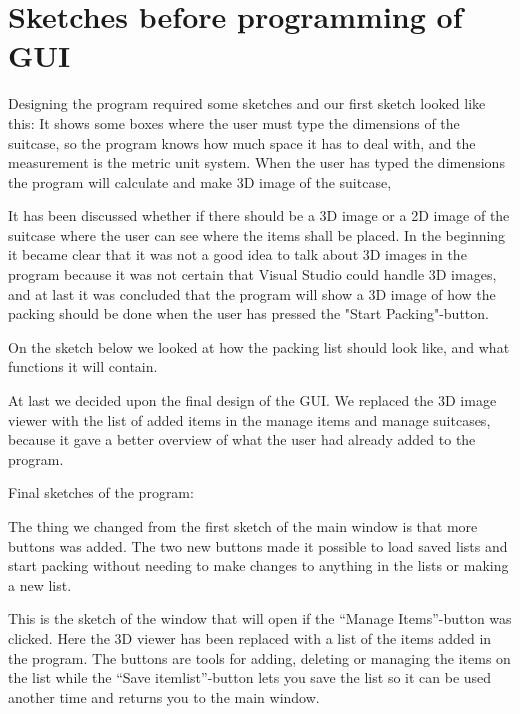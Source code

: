 \section{Sketches before programming of GUI}

Designing the program required some sketches and our first sketch looked like this:
It shows some boxes where the user must type the dimensions of the suitcase, so the program knows how much space it has to deal with, and the measurement is the metric unit system.
When the user has typed the dimensions the program will calculate and make 3D image of the suitcase, 


It has been discussed whether if there should be a 3D image or a 2D image of the suitcase where the user can see where the items shall be placed. In the beginning it became clear that it was not a good idea to talk about 3D images in the program because it was not certain that Visual Studio could handle 3D images, and at last it was concluded that the program will show a 3D image of how the packing should be done when the user has pressed the "Start Packing"-button.


On the sketch below we looked at how the packing list should look like, and what functions it will contain.


At last we decided upon the final design of the GUI. We replaced the 3D image viewer with the list of added items in the manage items and manage suitcases, because it gave a better overview of what the user had already added to the program. 

Final sketches of the program:

The thing we changed from the first sketch of the main window is that more buttons was added. The two new buttons made it possible to load saved lists and start packing without needing to make changes to anything in the lists or making a new list.


This is the sketch of the window that will open if the “Manage Items”-button was clicked. Here the 3D viewer has been replaced with a list of the items added in the program. The buttons are tools for adding, deleting or managing the items on the list while the “Save itemlist”-button lets you save the list so it can be used another time and returns you to the main window.

